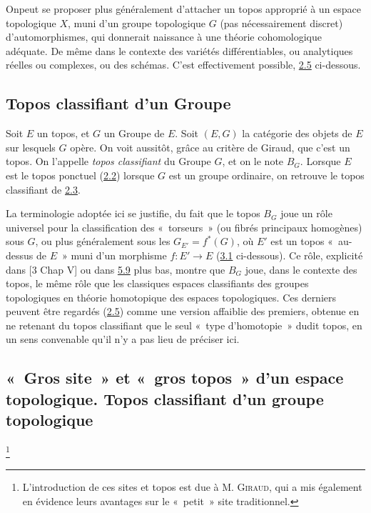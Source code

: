 \documentclass[10pt]{../fichiers-configuration-latex/smfart}
\begin{document}
On\pageoriginale peut se proposer plus généralement d'attacher
un topos approprié à un espace topologique $X$, muni d'un groupe
topologique $G$ (pas nécessairement discret) d'automorphismes, qui
donnerait naissance à une théorie cohomologique adéquate. De
même dans le contexte des variétés différentiables, ou
analytiques réelles ou complexes, ou des schémas. C'est
effectivement possible, \cf \hyperref[IV.subsec2.5]{2.5} ci-dessous.

\subsection{Topos classifiant d'un Groupe}

Soit $E$ un topos, et $G$ un Groupe de $E$. Soit $(E,G)$ la
catégorie des objets de $E$ sur lesquels $G$ opère. On voit
aussitôt, grâce au critère de Giraud, que c'est un topos. On
l'appelle \emph{topos classifiant} du Groupe $G$, et on le note
$B_G$. Lorsque $E$ est le topos ponctuel (\hyperref[IV.subsec2.2]{2.2}) \ie
lorsque $G$ est un groupe ordinaire, on retrouve le topos
classifiant de \hyperref[IV.subsec2.3]{2.3}.

La terminologie adoptée ici se justifie, du fait que le topos
$B_G$ joue un rôle universel pour la classification des « torseurs » (ou fibrés principaux homogènes) sous $G$, ou plus
généralement sous les $G_{E'}=f^{\ast}(G)$, où $E'$ est un
topos « au-dessus de $E$ »  \ie muni d'un morphisme
$f:E'\rightarrow E$ (\cf \hyperref[IV.def3.1]{3.1} ci-dessous). Ce rôle,
explicité dans [3 Chap V] ou dans \hyperref[IV.exer5.9]{5.9} plus bas,
montre que $B_G$ joue, dans le contexte des topos, le même rôle
que les classiques espaces classifiants des groupes topologiques en
théorie homotopique des espaces topologiques. Ces derniers peuvent
être regardés (\cf \hyperref[IV.subsec2.5]{2.5}) comme une version
affaiblie des premiers, obtenue en ne retenant du topos classifiant
que le seul « type d'homotopie »  dudit topos, en un sens
convenable qu'il n'y a pas lieu de préciser ici.

\subsection{« Gros site »  et « gros topos »  d'un espace
topologique. Topos classifiant d'un groupe
topologique}\footnote[1]{L'introduction de ces sites et topos est
due à M. \textsc{Giraud}, qui a mis également en évidence
leurs avantages sur le « petit »  site
traditionnel.}\pageoriginale
\end{document}
